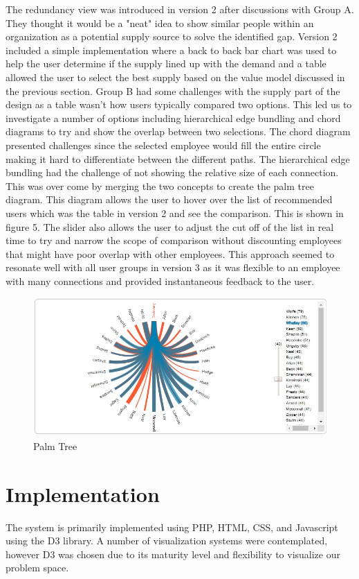 \documentclass[journal]{vgtc}                %
\begin{document}
The redundancy view was introduced in version 2 after discussions with Group A.  They thought it would be a "neat" idea to show similar people within an organization as a potential supply source to solve the identified gap.  Version 2 included a simple implementation where a back to back bar chart was used to help the user determine if the supply lined up with the demand and a table allowed the user to select the best supply based on the value model discussed in the previous section.
Group B had some challenges with the supply part of the design as a table wasn't how users typically compared two options.  This led us to investigate a number of options including hierarchical edge bundling and chord diagrams to try and show the overlap between two selections.  The chord diagram presented challenges since the selected employee would fill the entire circle making it hard to differentiate between the different paths.  The hierarchical edge bundling had the challenge of not showing the relative size of each connection.  This was over come by merging the two concepts to create the palm tree diagram.  This diagram allows the user to hover over the list of recommended users which was the table in version 2 and see the comparison.  This is shown in figure 5.  The slider also allows the user to adjust the cut off of the list in real time to try and narrow the scope of comparison without discounting employees that might have poor overlap with other employees.  This approach seemed to resonate well with all user groups in version 3 as it was flexible to an employee with many connections and provided instantaneous feedback to the user. 

\begin{figure}
	\centering
	\includegraphics[width=\columnwidth]{pictures/palmtree.jpg}
	\caption{Palm Tree}
	\label{fig:global}
\end{figure}

\section{Implementation}
The system is primarily implemented using PHP, HTML, CSS, and Javascript using the D3 library.  A number of visualization systems were contemplated, however D3 was chosen due to its maturity level and flexibility to visualize our problem space.
\end{document}
